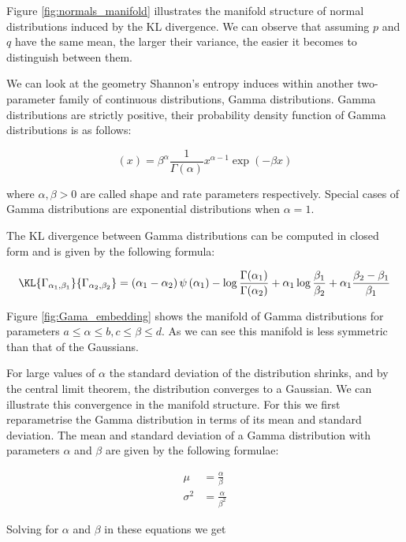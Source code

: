 Figure \ref{fig:normals_manifold} illustrates the manifold structure of normal distributions induced by the KL divergence. We can observe that assuming $p$ and $q$ have the same mean, the larger their variance, the easier it becomes to distinguish between them.

We can look at the geometry Shannon's entropy induces within another two-parameter family of continuous distributions, Gamma distributions. Gamma distributions are strictly positive, their probability density function of Gamma distributions is as follows:

\begin{equation}
(x) = \beta^{\alpha}\frac{1}{\Gamma(\alpha)} x^{\alpha-1} \exp(-\beta x)
\end{equation}

where $\alpha,\beta > 0$ are called shape and rate parameters respectively. Special cases of Gamma distributions are exponential distributions when $\alpha=1$.

The KL divergence between Gamma distributions can be computed in closed form and is given by the following formula:

\begin{equation}
	\KL{\Gamma_{\alpha_1,\beta_1}}{\Gamma_{\alpha_2,\beta_2}} = \left(\alpha_1 - \alpha_2\right)\psi\left(\alpha_1\right) - \log\frac{\Gamma(\alpha_1)}{\Gamma(\alpha_2)} + \alpha_1\log\frac{\beta_1}{\beta_2} + \alpha_1\frac{\beta_2 - \beta_1}{\beta_1} \label{eqn:KL_Gamma}
\end{equation}

Figure \ref{fig:Gama_embedding} shows the manifold of Gamma distributions for parameters $a \leq \alpha \leq b, c\leq \beta \leq d$. As we can see this manifold is less symmetric than that of the Gaussians.

For large values of $\alpha$ the standard deviation of the distribution shrinks, and by the central limit theorem, the distribution converges to a Gaussian. We can illustrate this convergence in the manifold structure. For this we first reparametrise the Gamma distribution in terms of its mean and standard deviation. The mean and standard deviation of a Gamma distribution with parameters $\alpha$ and $\beta$ are given by the following formulae:

\begin{align}
	\mu &= \frac{\alpha}{\beta}\\
	\sigma^2 &= \frac{\alpha}{\beta^2}
\end{align}

Solving for $\alpha$ and $\beta$ in these equations we get

